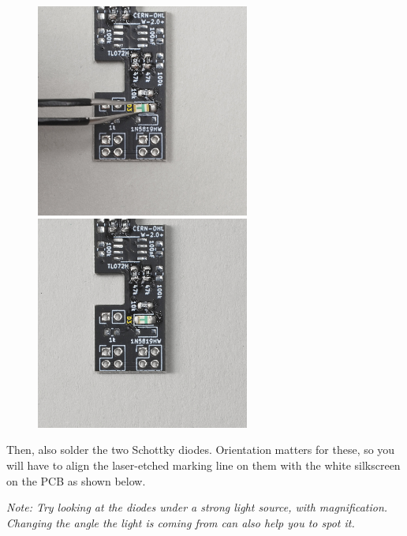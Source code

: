 \documentclass[12pt, a4paper]{article}
\begin{document}
\begin{figure}[H]
    \centering
    \includegraphics[width=7cm]{images/03_07_led_tweezers.jpg}
    \hspace{2mm}
    \includegraphics[width=7cm]{images/03_08_led_soldered.jpg}
\end{figure}

Then, also solder the two Schottky diodes. Orientation matters for these, so you will have to
align the laser-etched marking line on them with the white silkscreen on the PCB as shown below.

\textit{Note: Try looking at the diodes under a strong light source, with magnification.
Changing the angle the light is coming from can also help you to spot it.}
\end{document}
